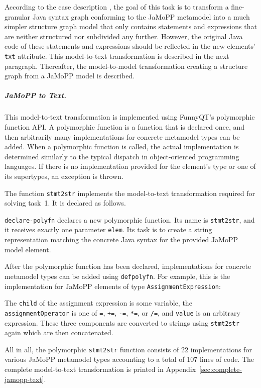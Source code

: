 \documentclass[submission]{eptcs}
\begin{document}
According to the case description \cite{flowgraphcasedesc}, the goal of this
task is to transform a fine-granular Java syntax graph conforming to the JaMoPP
metamodel \cite{jamopp09} into a much simpler structure graph model that only
contains statements and expressions that are neither structured nor subdivided
any further.  However, the original Java code of these statements and
expressions should be reflected in the new elements' \verb|txt| attribute.
This model-to-text transformation is described in the next paragraph.
Thereafter, the model-to-model transformation creating a structure graph from a
JaMoPP model is described.


\subparagraph{JaMoPP to Text.}
\label{sec:jamopp-text}

This model-to-text transformation is implemented using FunnyQT's polymorphic
function API.  A polymorphic function is a function that is declared once, and
then arbitrarily many implementations for concrete metamodel types can be
added.  When a polymorphic function is called, the actual implementation is
determined similarly to the typical dispatch in object-oriented programming
languages.  If there is no implementation provided for the element's type or
one of its supertypes, an exception is thrown.

The function \verb|stmt2str| implements the model-to-text transformation
required for solving task~1.  It is declared as follows.



\verb|declare-polyfn| declares a new polymorphic function.  Its name is
\verb|stmt2str|, and it receives exactly one parameter \verb|elem|.  Its task
is to create a string representation matching the concrete Java syntax for the
provided JaMoPP model element.

After the polymorphic function has been declared, implementations for concrete
metamodel types can be added using \verb|defpolyfn|.  For example, this is the
implementation for JaMoPP elements of type \verb|AssignmentExpression|:



The \verb|child| of the assignment expression is some variable, the
\verb|assignmentOperator| is one of \verb|=|, \verb|+=|, \verb|-=|, \verb|*=|,
or \verb|/=|, and \verb|value| is an arbitrary expression.  These three
components are converted to strings using \verb|stmt2str| again which are then
concatenated.

All in all, the polymorphic \verb|stmt2str| function consists of 22
implementations for various JaMoPP metamodel types accounting to a total of 107
lines of code.  The complete model-to-text transformation is printed in
Appendix~\ref{sec:complete-jamopp-text}.
\end{document}
